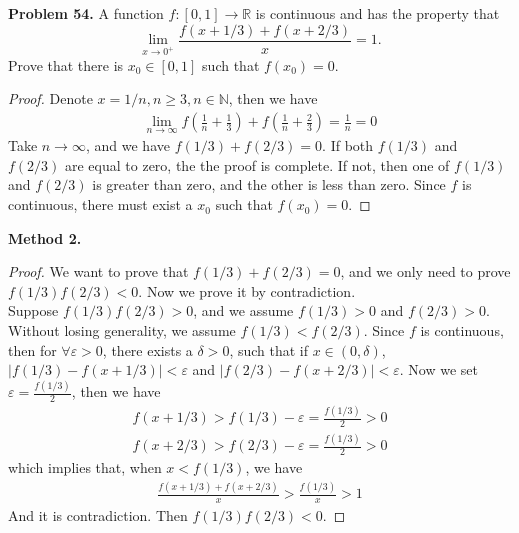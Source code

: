 \documentclass[12pt,leqno]{amsart}
\begin{document}
\noindent
{\bf Problem 54.}
A function $f:[0,1]\to \mathbb{R}$ is continuous and has the property that
$$
\lim_{x\to 0^+}\frac{f(x+1/3) + f(x+2/3)}{x} = 1.
$$
Prove that there is $x_0\in [0,1]$ such that $f(x_0) = 0$.
\begin{proof}
Denote $x=1/n, n\geq 3, n\in\mathbb{N}$, then we have 
\begin{align*}
    \lim_{n\to\infty} f\left(\frac{1}{n}+\frac{1}{3}\right) + f\left(\frac{1}{n}+\frac{2}{3}\right) = \frac{1}{n} = 0
\end{align*}
Take $n\to\infty$, and we have $f(1/3)+f(2/3)=0$. If both $f(1/3)$ and $f(2/3)$ are equal to zero, the the proof is complete. If not, then one of $f(1/3)$ and $f(2/3)$ is greater than zero, and the other is less than zero. Since $f$ is continuous, there must exist a $x_0$ such that $f(x_0)= 0$.
\end{proof}
\noindent
{\bf Method 2.}
\begin{proof}
We want to prove that $f(1/3)+f(2/3)=0$, and we only need to prove $f(1/3)f(2/3)<0$. Now we prove it by contradiction. \\
\hspace*{3em}Suppose $f(1/3)f(2/3)>0$, and we assume $f(1/3)>0$ and $f(2/3)>0$. Without losing generality, we assume $f(1/3)<f(2/3)$. Since $f$ is continuous, then for $\forall \varepsilon >0$, there exists a $\delta>0$, such that if $x\in(0,\delta)$, $|f(1/3)-f(x+1/3)|<\varepsilon$ and $|f(2/3)-f(x+2/3)|<\varepsilon$. Now we set $\varepsilon = \frac{f(1/3)}{2}$, then we have 
\begin{align*}
    f(x+1/3)>f(1/3)-\varepsilon=\frac{f(1/3)}{2}>0\\
    f(x+2/3)>f(2/3)-\varepsilon=\frac{f(1/3)}{2}>0
\end{align*}
which implies that, when $x<f(1/3)$, we have
\begin{align*}
    \frac{f(x+1/3)+f(x+2/3)}{x}>\frac{f(1/3)}{x} > 1
\end{align*}
And it is contradiction. Then $f(1/3)f(2/3)<0$.
\end{proof}

\medskip
\end{document}
